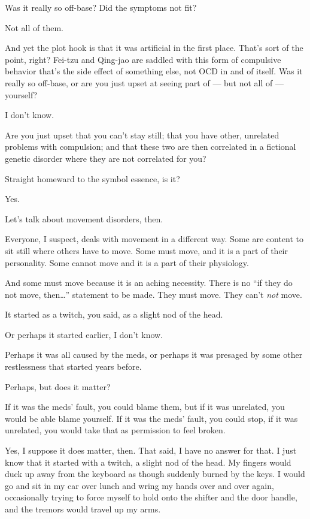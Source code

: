\begin{ally}
Was it really so off-base? Did the symptoms not fit?
\end{ally}
Not all of them.

\begin{ally}
And yet the plot hook is that it was artificial in the first place. That's sort of the point, right? Fei-tzu and Qing-jao are saddled with this form of compulsive behavior that's the side effect of something else, not OCD in and of itself. Was it really so off-base, or are you just upset at seeing part of --- but not all of --- yourself?
\end{ally}
I don't know.

\begin{ally}
Are you just upset that you can't stay still; that you have other, unrelated problems with compulsion; and that these two are then correlated in a fictional genetic disorder where they are not correlated for you?
\end{ally}
Straight homeward to the symbol essence, is it?

\begin{ally}
Yes.
\end{ally}
Let's talk about movement disorders, then.
\newpage

\noindent Everyone, I suspect, deals with movement in a different way. Some are content to sit still where others have to move. Some must move, and it is a part of their personality. Some cannot move and it is a part of their physiology.

And some must move because it is an aching necessity. There is no ``if they do not move, then\ldots{}'' statement to be made. They must move. They can't \emph{not} move.

\begin{ally}
It started as a twitch, you said, as a slight nod of the head.
\end{ally}
Or perhaps it started earlier, I don't know.

\begin{ally}
Perhaps it was all caused by the meds, or perhaps it was presaged by some other restlessness that started years before.
\end{ally}
Perhaps, but does it matter?

\begin{ally}
If it was the meds' fault, you could blame them, but if it was unrelated, you would be able blame yourself. If it was the meds' fault, you could stop, if it was unrelated, you would take that as permission to feel broken.
\end{ally}
Yes, I suppose it does matter, then. That said, I have no answer for that. I just know that it started with a twitch, a slight nod of the head. My fingers would duck up away from the keyboard as though suddenly burned by the keys. I would go and sit in my car over lunch and wring my hands over and over again, occasionally trying to force myself to hold onto the shifter and the door handle, and the tremors would travel up my arms.


